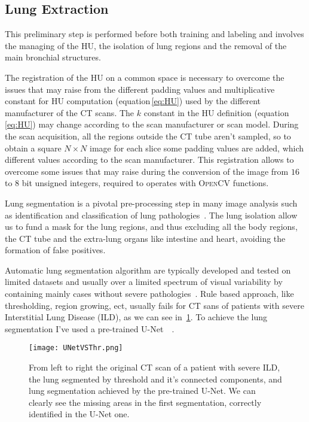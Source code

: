 \documentclass{standalone}
\begin{document}
	\subsection*{Lung Extraction}
	
	This preliminary step is performed before both training and labeling and involves the managing of the HU, the isolation of lung regions and the removal of the main bronchial structures.
	
	The registration of the HU on a common space is necessary to overcome the issues that may raise from the different padding values and multiplicative constant for HU computation (equation\,\ref{eq:HU}) used by the different manufacturer of the CT scans. The $k$ constant in the HU definition (equation\,\ref{eq:HU}) may change according to the scan manufacturer or scan model. During the scan acquisition, all the regions outside the CT tube aren't sampled, so to obtain a square $N\times N$ image for each slice some padding values are added, which different values according to the scan manufacturer. This registration allows to overcome some issues that may raise during the conversion of the image from $16$ to $8$ bit unsigned integers, required to operates with \textsc{OpenCV} functions.
	
	
	Lung segmentation is a pivotal pre-processing step in many image analysis such as identification and classification of lung pathologies~\cite{ART:Johannes}. The lung isolation allow us to fund a mask for the lung regions, and thus excluding  all the body regions, the CT tube and the extra-lung organs like intestine and heart, avoiding the formation of false positives.
	
	Automatic lung segmentation algorithm are typically developed and tested on limited datasets and usually over a limited spectrum of visual variability by containing mainly cases without severe pathologies~\cite{ART:Johannes}. Rule based approach, like thresholding, region growing, ect, usually fails for CT sans of patients with severe Interstitial Lung Disease (ILD), as we can see in \figurename\,\ref{fig:UNetVSThr}. To achieve the lung segmentation I've used a pre-trained U-Net~\cite{ART:Johannes}~\cite{REP:lungmask}. 
	\begin{figure}[h!]
		\centering
		\texttt{[image: UNetVSThr.png]}
		\caption{From left to right the original CT scan of a patient with severe ILD, the lung segmented by threshold and it's connected components, and lung segmentation achieved by the pre-trained U-Net. We can clearly see the missing areas in the first segmentation, correctly identified in the U-Net one.}\label{fig:UNetVSThr}
	\end{figure}
\end{document}
